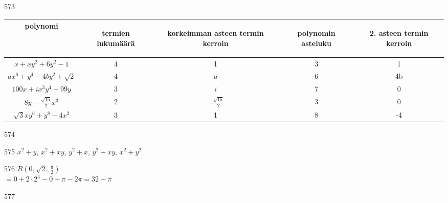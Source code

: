 \begin{Vastaus}{573}
    \begin{footnotesize}
    \begin{tabular}{|c|c|c|c|c|}
                                                                         \hline
polynomi
& \begin{sideways}termien lukumäärä\end{sideways}%
& \begin{sideways}korkeimman asteen termin kerroin\end{sideways}%
& \begin{sideways}polynomin asteluku\end{sideways}%
& \begin{sideways}2. asteen termin kerroin\end{sideways} \\ \hline
$ x+xy^2+6y^2-1$ 		&      4  &         1      &       3   &    1       \\ \hline
$ ax^6+y^4-4by^2+\sqrt{2}$  	&     4    &    $a$       &    6   &     4b       \\ \hline
$ 100x+ ix^3y^4-99y$          	&    3     &      $i$    &     7     &    0       \\ \hline
$ 8y-\frac{\sqrt{15}}{2}x^3$	 &     2     &    $-\frac{\sqrt{15}}{2}$    &     3    &    0   \\ \hline
$ \sqrt{3}xy^6 + y^8 - 4x^2$ 	&   3       &         1        &    8      &     -4       \\ \hline
    \end{tabular}
    \end{footnotesize}
     
\end{Vastaus}
\begin{Vastaus}{574}
	
\end{Vastaus}
\begin{Vastaus}{575}
		$x^2+y$, $x^2+xy$, $y^2+x$, $y^2+xy$, $x^2+y^2$
	
\end{Vastaus}
\begin{Vastaus}{576}
	$R(0,\sqrt{2},\frac{\pi}{2})$ \\ $=0+2\cdot2^4-0+\pi-2\pi=32-\pi$
	
\end{Vastaus}
\begin{Vastaus}{577}
    
\end{Vastaus}
